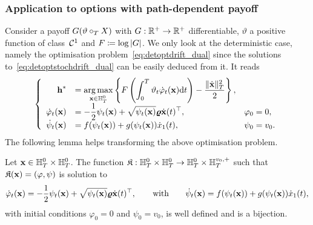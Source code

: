 \subsubsection{\textbf{Application to options with path-dependent payoff}}
\label{sec:PayoffPathDepG}
\sloppy Consider a payoff $G(\vartheta\circ_{T} X)$ with ${G:\mathbb{R}^{+} \rightarrow \mathbb{R}^{+}}$ differentiable, 
$\vartheta$ a positive function of class~$\mathcal{C}^1$ and $F \coloneqq \log|G|$. 
We only look at the deterministic case, 
namely the optimisation problem~\eqref{eq:detoptdrift_dual} since the solutions to~\eqref{eq:detoptstochdrift_dual} can be easily deduced from it. It reads
\begin{equation*}
\left\{
\begin{array}{rll}
\boldsymbol{\mathrm{h}}^* & = \displaystyle \operatorname*{arg\,max}\limits_{\boldsymbol{\mathrm{x}}\in \mathbb{H}_T^0} 
\left\{F\left(\int_0^T\vartheta_t \dot{\varphi}_t(\boldsymbol{\mathrm{x}}) \mathrm{d} t\right) - \frac{\|\dot{\boldsymbol{\mathrm{x}}}\|_{T}^2}{2}\right\},\\
\dot{\varphi}_t(\boldsymbol{\mathrm{x}}) & = \displaystyle -\frac{1}{2}\psi_t(\boldsymbol{\mathrm{x}}) + \sqrt{\psi_t(\boldsymbol{\mathrm{x}})}\boldsymbol{\mathrm{\varrho}} \dot{\boldsymbol{\mathrm{x}}}(t)^\top, & \varphi_0 = 0,\\
\dot{\psi}_t(\boldsymbol{\mathrm{x}}) & = \displaystyle f(\psi_t(\boldsymbol{\mathrm{x}})) + g(\psi_t(\boldsymbol{\mathrm{x}})) \dot{x}_1(t), & \psi_0 = v_0.
\end{array}
\right.
\end{equation*}
The following lemma helps transforming the above optimisation problem.
\begin{lemma}\label{lem:Simplify}
Let $\boldsymbol{\mathrm{x}}\in \mathbb{H}_T^0 \times \mathbb{H}_T^0$. The function $\mathfrak{K}:\mathbb{H}_T^0 \times \mathbb{H}_T^0 \rightarrow \mathbb{H}_T^0\times \mathbb{H}_T^{v_0,+}$ such that $\mathfrak{K}(\boldsymbol{\mathrm{x}})=(\varphi,\psi)$ is solution to
$$
\dot{\varphi}_t(\boldsymbol{\mathrm{x}})  = -\frac{1}{2}\psi_t(\boldsymbol{\mathrm{x}}) + \sqrt{\psi_t(\boldsymbol{\mathrm{x}})}\boldsymbol{\mathrm{\varrho}} \dot{\boldsymbol{\mathrm{x}}}(t)^\top,
\qquad\text{with}\qquad
\dot{\psi}_t(\boldsymbol{\mathrm{x}}) = f(\psi_t(\boldsymbol{\mathrm{x}})) + g(\psi_t(\boldsymbol{\mathrm{x}})) \dot{x}_1(t),
$$
with initial conditions $\varphi_0 = 0$ and $\psi_0 = v_0$, is well defined and is a bijection.
\end{lemma}

